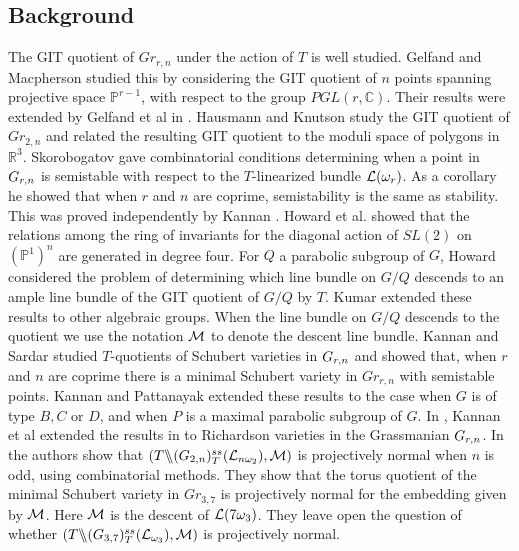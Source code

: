 \subsection{Background}
The GIT quotient of $Gr_{r,n}$ under the action of $T$ is well studied. Gelfand and Macpherson \cite{gelfand1982geometry} studied this by considering the GIT quotient of
$n$ points spanning projective space ${\mathbb P}^{r-1}$, with respect to the group $PGL(r,\mathbb{C})$. Their results were extended by Gelfand et al in \cite{gelfand1987combinatorial}. Hausmann and Knutson\cite{hausmann1997polygon} study the GIT quotient of $Gr_{2,n}$ and related the resulting GIT quotient to the moduli space of polygons in ${\mathbb R}^3$. Skorobogatov \cite{skorobogatov1993swinnerton} gave combinatorial conditions determining when a point in $G_{{r},{n}}$ is semistable with respect to the $T$-linearized bundle ${\cal L}(\omega_r)$. As a corollary he showed that when $r$ and $n$ are coprime, semistability is the same as stability. This was proved independently by  Kannan \cite{kannan1998torus}. Howard et al. \cite{howard2005projective} showed that the relations among the ring of invariants for the diagonal action of $SL(2)$ on $({\mathbb P}^1)^n$ are generated in degree four.  For $Q$ a parabolic subgroup of $G$, Howard \cite{howard2005matroids} considered the problem of determining which line bundle on $G/Q$ descends to an ample line bundle of the GIT quotient of $G/Q$ by $T$. Kumar \cite{kumar2008descent} extended these results to other algebraic groups. When the line bundle on $G/Q$ descends to the quotient we use the notation ${\cal M}$ to denote the descent line bundle.  Kannan and Sardar \cite{kannan2009torusA}  studied $T$-quotients of Schubert varieties in $G_{{r},{n}}$ and showed that, when $r$ and $n$ are coprime there is a minimal Schubert variety in $Gr_{r,n}$ with semistable points. Kannan and Pattanayak extended these results to the case when $G$ is of type $B,C$ or $D$, and when $P$ is a maximal parabolic subgroup of $G$.  In \cite{kannan2018torus}, Kannan et al extended the results in \cite{kannan2009torusA} to Richardson varieties in the Grassmanian $G_{{r},{n}}$. 
In \cite{bakshi2020torus} the authors show that $(T \backslash\mkern-6mu\backslash (G_{{2},{n}})^{ss}_T{ ({\cal L}_{n\omega_2})}, {\cal M})$ is projectively normal when $n$ is odd, using combinatorial methods. They show that the torus quotient of the  minimal Schubert variety in $Gr_{3,7}$ is projectively normal for the embedding given by ${\cal M}$. Here ${\cal M}$ is the descent of ${\cal L}(7 \omega_3)$.  They leave open the question of whether $(T \backslash\mkern-6mu\backslash (G_{{3},{7}})^{ss}_T{ ({\cal L}_{\omega_3})}, {\cal M})$ is projectively normal.


